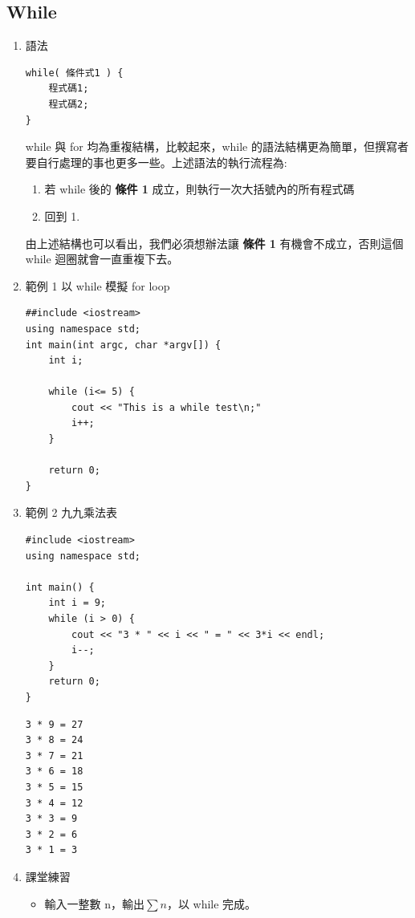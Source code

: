 \documentclass[a4paper,12pt]{article}
\begin{document}
\subsection{While}
\label{sec:orgfe469fd}
\begin{enumerate}
\item 語法
\label{sec:orgd6f30c2}
\lstset{breaklines=true,language=cpp,label= ,caption= ,captionpos=b,firstnumber=1,numbers=left}
\begin{lstlisting}
while( 條件式1 ) {
    程式碼1;
    程式碼2;
}
\end{lstlisting}
while 與 for 均為重複結構，比較起來，while 的語法結構更為簡單，但撰寫者要自行處理的事也更多一些。上述語法的執行流程為:\\
\begin{enumerate}
\item 若 while 後的 \textbf{條件 1} 成立，則執行一次大括號內的所有程式碼\\
\item 回到 1.\\
\end{enumerate}
由上述結構也可以看出，我們必須想辦法讓 \textbf{條件 1} 有機會不成立，否則這個 while 迴圈就會一直重複下去。\\
\item 範例 1
\label{sec:orge686c40}
以 while 模擬 for loop\\
\lstset{breaklines=true,language=cpp,label= ,caption= ,captionpos=b,firstnumber=1,numbers=left}
\begin{lstlisting}
##include <iostream>
using namespace std;
int main(int argc, char *argv[]) {
    int i;

    while (i<= 5) {
        cout << "This is a while test\n;"
        i++;
    }

    return 0;
}
\end{lstlisting}

\item 範例 2
\label{sec:orgb689baa}
九九乘法表\\
\lstset{breaklines=true,language=cpp,label= ,caption= ,captionpos=b,firstnumber=1,numbers=left}
\begin{lstlisting}
#include <iostream>
using namespace std;

int main() {
    int i = 9;
    while (i > 0) {
        cout << "3 * " << i << " = " << 3*i << endl;
        i--;
    }
    return 0;
}
\end{lstlisting}

\begin{verbatim}
3 * 9 = 27
3 * 8 = 24
3 * 7 = 21
3 * 6 = 18
3 * 5 = 15
3 * 4 = 12
3 * 3 = 9
3 * 2 = 6
3 * 1 = 3
\end{verbatim}
\item 課堂練習
\label{sec:org15b4f00}
\begin{itemize}
\item 輸入一整數 n，輸出\(\sum{n}\)，以 while 完成。\\
\end{itemize}
\end{enumerate}
\end{document}
